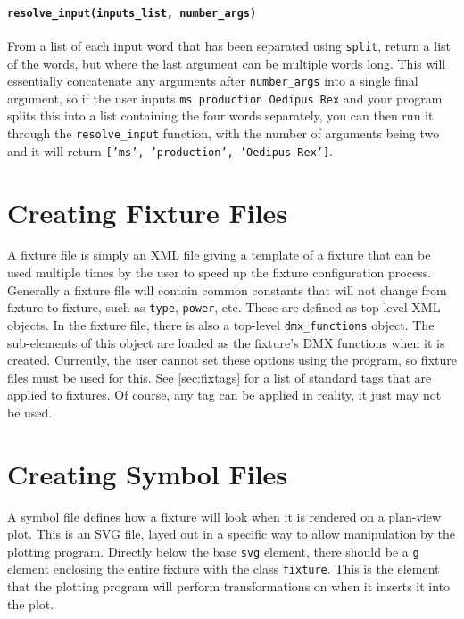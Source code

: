 \documentclass[a4paper]{article}
\begin{document}
\paragraph{\texttt{resolve\_input(inputs\_list, number\_args)}}
From a list of each input word that has been separated using \texttt{split}, 
return a list of the words, but where the last argument can be multiple words 
long. This will essentially concatenate any arguments after 
\texttt{number\_args} into a single final argument, so if the user inputs 
\texttt{ms production Oedipus Rex} and your program splits this into a list 
containing the four words separately, you can then run it through the 
\texttt{resolve\_input} function, with the number of arguments being two and 
it will return \texttt{['ms', 'production', 'Oedipus Rex']}.

\section{Creating Fixture Files}
A fixture file is simply an XML file giving a template of a fixture that can 
be used multiple times by the user to speed up the fixture configuration 
process. Generally a fixture file will contain common constants that will not 
change from fixture to fixture, such as \texttt{type}, \texttt{power}, etc. 
These are defined as top-level XML objects. In the fixture file, there is also 
a top-level \texttt{dmx\_functions} object. The sub-elements of this object 
are loaded as the fixture's DMX functions when it is created. Currently, the 
user cannot set these options using the program, so fixture files must be 
used for this. See \autoref{sec:fixtags} for a list of standard tags that 
are applied to fixtures. Of course, any tag can be applied in reality, it 
just may not be used.

\section{Creating Symbol Files}
A symbol file defines how a fixture will look when it is rendered on a 
plan-view plot. This is an SVG file, layed out in a specific way to allow 
manipulation by the plotting program. Directly below the base \texttt{svg} 
element, there should be a \texttt{g} element enclosing the entire fixture 
with the class \texttt{fixture}. This is the element that the plotting 
program will perform transformations on when it inserts it into the plot. 
\end{document}
